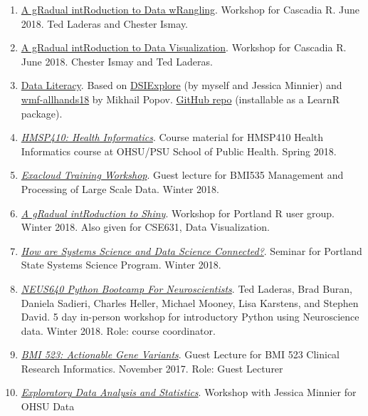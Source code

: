 \documentclass[11pt,]{article}
\begin{document}
\begin{enumerate}
\def\labelenumi{\arabic{enumi}.}
\item
  \href{https://cascadiarconf-wrangle.netlify.com}{A gRadual
  intRoduction to Data wRangling}. Workshop for Cascadia R. June 2018.
  Ted Laderas and Chester Ismay.
\item
  \href{https://cascadiarconf-viz.netlify.com}{A gRadual intRoduction to
  Data Visualization}. Workshop for Cascadia R. June 2018. Chester Ismay
  and Ted Laderas.
\item
  \href{http://tladeras.shinyapps.io/dataLiteracy/}{Data Literacy}.
  Based on \href{http://github.com/laderast/DSIExplore}{DSIExplore} (by
  myself and Jessica Minnier) and
  \href{https://github.com/bearloga/wmf-allhands18}{wmf-allhands18} by
  Mikhail Popov.
  \href{https://github.com/laderast/dataLiteracyTutorial}{GitHub repo}
  (installable as a LearnR package).
\item
  \href{http://laderast.github.io/HMSP410}{\emph{HMSP410: Health
  Informatics}}. Course material for HMSP410 Health Informatics course
  at OHSU/PSU School of Public Health. Spring 2018.
\item
  \href{https://laderast.github.io/exacloud_tutorial/}{\emph{Exacloud
  Training Workshop}}. Guest lecture for BMI535 Management and
  Processing of Large Scale Data. Winter 2018.
\item
  \href{https://laderast.github.io/gradual_shiny/}{\emph{A gRadual
  intRoduction to Shiny}}. Workshop for Portland R user group. Winter
  2018. Also given for CSE631, Data Visualization.
\item
  \href{https://laderast.github.io/sysc_data_sci/}{\emph{How are Systems
  Science and Data Science Connected?}}. Seminar for Portland State
  Systems Science Program. Winter 2018.
\item
  \href{https://github.com/dasaderi/python_neurobootcamp}{\emph{NEUS640
  Python Bootcamp For Neuroscientists}}. Ted Laderas, Brad Buran,
  Daniela Sadieri, Charles Heller, Michael Mooney, Lisa Karstens, and
  Stephen David. 5 day in-person workshop for introductory Python using
  Neuroscience data. Winter 2018. Role: course coordinator.
\item
  \href{https://laderast.github.io/BMI523slides/}{\emph{BMI 523:
  Actionable Gene Variants}}. Guest Lecture for BMI 523 Clinical
  Research Informatics. November 2017. Role: Guest Lecturer
\item
  \href{https://github.com/laderast/DSIExplore}{\emph{Exploratory Data
  Analysis and Statistics}}. Workshop with Jessica Minnier for OHSU Data

\end{enumerate}
\end{document}
